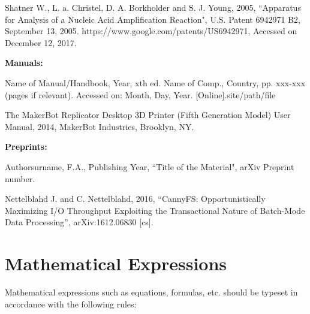 \documentclass[a4paper,oneside,12pt]{report}
\numberwithin{equation}{chapter}
\begin{document}
\leftskip 5mm \parindent -5mm Shatner W., L. a. Christel, D. A. Borkholder and S. J. Young, 2005, ``Apparatus for Analysis of a Nucleic Acid Amplification Reaction", U.S. Patent 6942971 B2, September 13, 2005. https://www.google.com/patents/US6942971, Accessed on December 12, 2017.


\leftskip 5mm \parindent -5mm \textbf{Manuals:}

\leftskip 5mm \parindent -5mm Name of Manual/Handbook, Year, xth ed. Name of Comp.,  Country, pp. xxx-xxx (pages if relevant). Accessed on: Month, Day, Year. [Online].site/path/file 

\leftskip 5mm \parindent -5mm The MakerBot Replicator Desktop 3D Printer (Fifth Generation Model) User Manual, 2014, MakerBot Industries, Brooklyn, NY.\newline


\leftskip 5mm \parindent -5mm \textbf{Preprints:}

\leftskip 5mm \parindent -5mm Authorsurname, F.A., Publishing Year, ``Title of the 
Material", arXiv Preprint number.

\leftskip 5mm \parindent -5mm Nettelblahd J. and C. Nettelblahd, 2016, “CannyFS: Opportunistically Maximizing I/O Throughput Exploiting the Transactional Nature of Batch-Mode Data Processing”, arXiv:1612.06830 [cs].

\leftskip -5mm
\parindent 10mm

\section{Mathematical Expressions}
Mathematical expressions such as equations, formulas, etc. should be typeset in accordance with the following rules:
\end{document}
